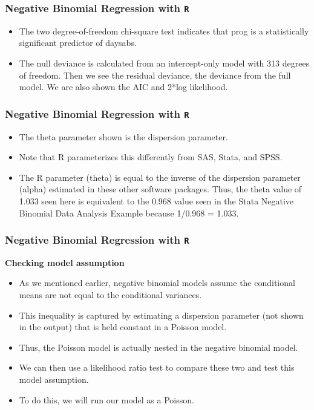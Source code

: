 \documentclass[00-GLMregslides.tex]{subfiles}
\begin{document}
\begin{frame}[fragile]
	\frametitle{Negative Binomial Regression with \texttt{R} }
	\Large
	
	\begin{itemize}
	\item The two degree-of-freedom chi-square test indicates that prog is a statistically significant predictor of daysabs.
	\item The null deviance is calculated from an intercept-only model with 313 degrees of freedom. Then we see the residual deviance, the deviance from the full model. We are also shown the AIC and 2*log likelihood.
\end{itemize}
\end{frame}
\begin{frame}[fragile]
	\frametitle{Negative Binomial Regression with \texttt{R} }
	\Large
\begin{itemize}
	\item The theta parameter shown is the dispersion parameter. 
	\item Note that R parameterizes this differently from SAS, Stata, and SPSS. 
	\item The R parameter (theta) is equal to the inverse of the dispersion parameter (alpha) estimated in these other software packages. Thus, the theta value of 1.033 seen here is equivalent to the 0.968 value seen in the Stata Negative Binomial Data Analysis Example because 1/0.968 = 1.033.
\end{itemize}
\end{frame}
\begin{frame}[fragile]
	\frametitle{Negative Binomial Regression with \texttt{R} }
	\Large
	
	\textbf{Checking model assumption}
\begin{itemize}
	\item	
	As we mentioned earlier, negative binomial models assume the conditional means are not equal to the conditional 
	variances. 
	\item This inequality is captured by estimating a dispersion parameter (not shown in the output) that is held
	constant in a Poisson model. 
	\item Thus, the Poisson model is actually nested in the negative binomial model. 
	\item We can then use a likelihood ratio test to compare these two and test this model assumption. 
	\item To do this, we will run our model as a Poisson.
\end{itemize}
\end{frame}
\end{document}
